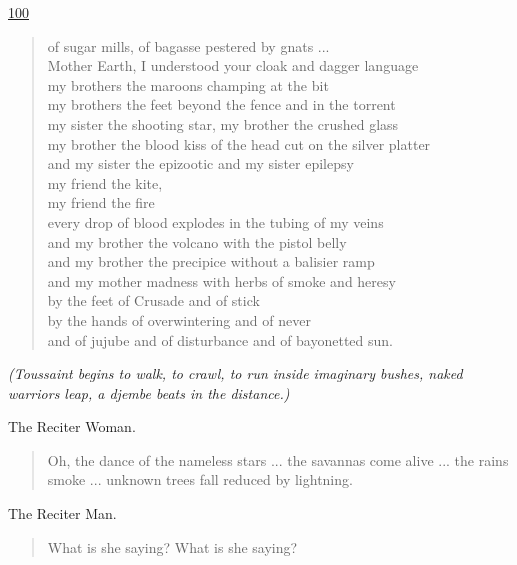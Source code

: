 \documentclass[letterpaper,article,12pt,oneside,notitlepage]{memoir}
\begin{document}
\clearpage

\href{http://cesaire.elotroalex.com/chiens/chiens/p100.html}{100}

\begin{verse}
of sugar mills, of bagasse pestered by gnats ... \\
Mother Earth, I understood your cloak and dagger language \\
my brothers the maroons champing at the bit \\
my brothers the feet beyond the fence and in the torrent \\
my sister the shooting star, my brother the crushed glass \\
my brother the blood kiss of the head cut on the silver platter \\
and my sister the epizootic and my sister epilepsy \\
my friend the kite, \\
my friend the fire \\
every drop of blood explodes in the tubing of my veins \\
and my brother the volcano with the pistol belly \\
and my brother the precipice without a balisier ramp \\
and my mother madness with herbs of smoke and heresy \\
by the feet of Crusade and of stick \\
by the hands of overwintering and of never \\
and of jujube and of disturbance and of bayonetted sun. \\
\end{verse}

\textit{(Toussaint begins to walk, to crawl, to run inside imaginary bushes, naked warriors leap, a djembe beats in the distance.)}

\begin{center}The Reciter Woman.\end{center}

\begin{verse}
\indent Oh, the dance of the nameless stars ... the savannas come alive ... the rains smoke ... unknown trees fall reduced by lightning.  \\
\end{verse}

\begin{center}The Reciter Man.\end{center}

\begin{verse}
\indent What is she saying? What is she saying?  \\
\end{verse}
\end{document}
